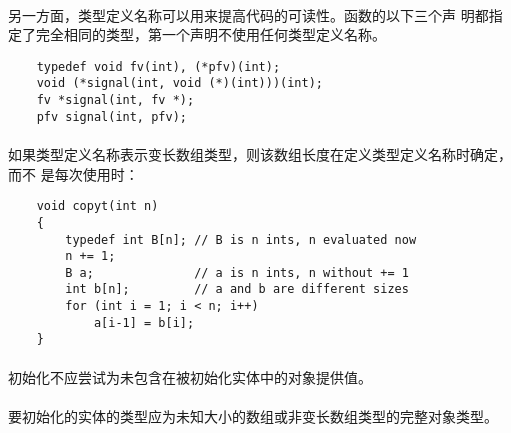 {\paragraph{}
\ex 另一方面，类型定义名称可以用来提高代码的可读性。函数的以下三个声
明都指定了完全相同的类型，第一个声明不使用任何类型定义名称。
\begin{lstlisting}
    typedef void fv(int), (*pfv)(int);
    void (*signal(int, void (*)(int)))(int);
    fv *signal(int, fv *);
    pfv signal(int, pfv);
\end{lstlisting}

\paragraph{}
\ex 如果类型定义名称表示变长数组类型，则该数组长度在定义类型定义名称时确定，而不
是每次使用时：
\begin{lstlisting}
    void copyt(int n)
    {
        typedef int B[n]; // B is n ints, n evaluated now
        n += 1;
        B a;              // a is n ints, n without += 1
        int b[n];         // a and b are different sizes
        for (int i = 1; i < n; i++)
            a[i-1] = b[i];
    }
\end{lstlisting}

\syntax
\paragraph{}

\constraint
\paragraph{}
初始化不应尝试为未包含在被初始化实体中的对象提供值。

\paragraph{}
要初始化的实体的类型应为未知大小的数组或非变长数组类型的完整对象类型。

}
